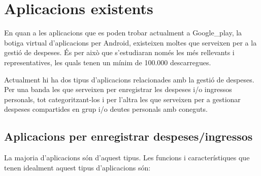 \section{Aplicacions existents}
En quan a les aplicacions que es poden trobar actualment a \gls{Google_play}, la botiga virtual d'aplicacions per \gls{Android}, existeixen moltes que serveixen per a la gestió de despeses. És per això que s'estudiaran només les més rellevants i representatives, les quals tenen un mínim de 100.000 descarregues. 

Actualment hi ha dos tipus d'aplicacions relacionades amb la gestió de despeses. Per una banda les que serveixen per enregistrar les despeses i/o ingressos personals, tot categoritzant-los i per l'altra les que serveixen per a gestionar despeses compartides en grup i/o deutes personals amb coneguts.

\subsection{Aplicacions per enregistrar despeses/ingressos}
La majoria d'aplicacions són d'aquest tipus. Les funcions i característiques que tenen idealment aquest tipus d'aplicacions són:

